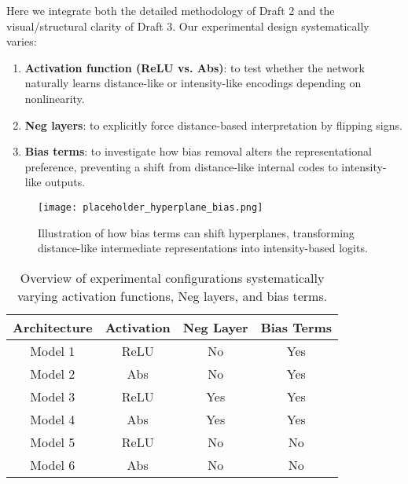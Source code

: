 \documentclass{article}
\begin{document}
Here we integrate both the detailed methodology of Draft 2 and the visual/structural clarity of Draft 3. Our experimental design systematically varies:
\begin{enumerate}
    \item \textbf{Activation function (ReLU vs. Abs)}: to test whether the network naturally learns distance-like or intensity-like encodings depending on nonlinearity.
    \item \textbf{Neg layers}: to explicitly force distance-based interpretation by flipping signs.
    \item \textbf{Bias terms}: to investigate how bias removal alters the representational preference, preventing a shift from distance-like internal codes to intensity-like outputs.
\end{enumerate}

\begin{figure}[ht]
    \centering
    \texttt{[image: placeholder\_hyperplane\_bias.png]}
    \caption{Illustration of how bias terms can shift hyperplanes, transforming distance-like intermediate representations into intensity-based logits.}
    \label{fig:hyperplane_bias}
\end{figure}

\begin{table}[ht]
\centering
\begin{tabular}{|c|c|c|c|}
\hline
\textbf{Architecture} & \textbf{Activation} & \textbf{Neg Layer} & \textbf{Bias Terms} \\
\hline
Model 1 & ReLU & No & Yes \\
Model 2 & Abs & No & Yes \\
Model 3 & ReLU & Yes & Yes \\
Model 4 & Abs & Yes & Yes \\
Model 5 & ReLU & No & No \\
Model 6 & Abs & No & No \\
\hline
\end{tabular}
\caption{Overview of experimental configurations systematically varying activation functions, Neg layers, and bias terms.}
\label{tab:architectures}
\end{table}
\end{document}

